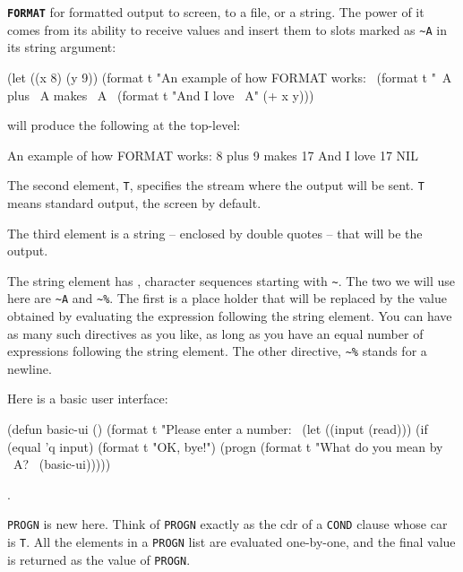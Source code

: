 \documentclass[a4paper,11pt]{article}
\begin{document}
\begin{uenum}

\item {\bf \Verb+FORMAT+} for formatted output to screen, to a file, or a
	string. The power of it comes from its ability to receive values and
	insert them to slots marked as \Verb+~A+ in its string argument:  
	  

\begin{lispcode}
(let ((x 8) (y 9))
    (format t "An example of how FORMAT works:~%
    (format t "~A plus ~A makes ~A~%
    (format t "And I love ~A" (+ x y)))
\end{lispcode}
will produce the following at the top-level:

\begin{lispcode}
An example of how FORMAT works:
8 plus 9 makes 17
And I love 17
NIL
\end{lispcode}

\begin{uenumi}
\item The second element, \Verb+T+, specifies the stream where the output will be sent. \Verb+T+ means standard output, the screen by default.
\item The third element is a string -- enclosed by double quotes -- that will be the output.
\item The string element has , character sequences starting with \Verb+~+. The two we will use here are \Verb+~A+ and \Verb+~%
The first is a place holder that will be replaced by the value obtained by evaluating the expression following the string element. You can have as many such directives as you like, as long as you have an equal number of expressions following the string element. The other directive, \Verb+~%
\end{uenumi}

\item Here is a basic user interface:

\begin{lispcode}
(defun basic-ui ()
  (format t "Please enter a number:~%
  (let ((input (read)))
	(if (equal 'q input)
	  (format t "OK, bye!")
	  (progn 
		(format t "What do you mean by ~A?~%
		(basic-ui)))))
\end{lispcode}

\item . 
\item \Verb+PROGN+ is new here. Think of \Verb+PROGN+ exactly as the cdr of a \Verb+COND+ clause whose car is \Verb+T+. All the elements in a \Verb+PROGN+ list are evaluated one-by-one, and the final value is returned as the value of \Verb+PROGN+.

\end{uenum}
\end{document}
